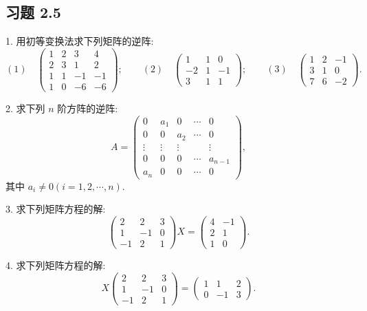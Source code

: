 \documentclass[UTF8,12pt,a4paper,fontset=fandol]{ctexart}
\begin{document}
\subsection*{习题 2.5}

1. 用初等变换法求下列矩阵的逆阵:
\[
(1)\quad
\left(\begin{array}{rrrr}
1 & 2 & 3 & 4\\
2 & 3 & 1 & 2\\
1 & 1 & -1 & -1\\
1 & 0 & -6 & -6
\end{array}\right);
\qquad
(2)\quad
\left(\begin{array}{rrr}
1 & 1 & 0\\
-2 & 1 & -1\\
3 & 1 & 1
\end{array}\right);
\qquad
(3)\quad
\left(\begin{array}{rrr}
1 & 2 & -1\\
3 & 1 & 0\\
7 & 6 & -2
\end{array}\right).
\]

2. 求下列 $n$ 阶方阵的逆阵:
\[
A=\left(\begin{array}{ccccc}
0 & a_1 & 0 & \cdots & 0\\
0 & 0 & a_2 & \cdots & 0\\
\vdots & \vdots & \vdots & & \vdots\\
0 & 0 & 0 & \cdots & a_{n-1}\\
a_n & 0 & 0 & \cdots & 0
\end{array}\right),
\]
其中 $a_i\ne 0(i=1,2,\cdots,n)$.

3. 求下列矩阵方程的解:
\[
\left(\begin{array}{rrr}
2 & 2 & 3\\
1 & -1 & 0\\
-1 & 2 & 1
\end{array}\right)X=
\left(\begin{array}{rr}
4 & -1\\
2 & 1\\
1 & 0
\end{array}\right).
\]

4. 求下列矩阵方程的解:
\[
X\left(\begin{array}{rrr}
2 & 2 & 3\\
1 & -1 & 0\\
-1 & 2 & 1
\end{array}\right)=
\left(\begin{array}{rrr}
1 & 1 & 2\\
0 & -1 & 3
\end{array}\right).
\]
\end{document}
